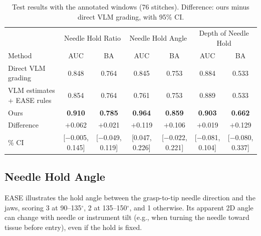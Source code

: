 \begin{table}[htb]
\centering
\small
\setlength{\tabcolsep}{4pt}
\caption{Test results with the annotated windows (76 stitches). Difference:
ours minus direct VLM grading, with 95\% CI.}
\label{tab:main}
\begin{tabular}{@{}lcccccc@{}}
\hline
& \multicolumn{2}{c}{Needle Hold Ratio} & \multicolumn{2}{c}{Needle Hold Angle}
& \multicolumn{2}{c}{Depth of Needle Hold} \\
Method & AUC & BA & AUC & BA & AUC & BA \\
\hline
Direct VLM grading & 0.848 & 0.764 & 0.845 & 0.753 & 0.884 & 0.533 \\
VLM estimates + EASE rules & 0.854 & 0.764 & 0.761 & 0.753 & 0.889 & 0.533 \\
Ours & \textbf{0.910} & \textbf{0.785} & \textbf{0.964} & \textbf{0.859}
& \textbf{0.903} & \textbf{0.662} \\
\hline
Difference & $+$0.062 & $+$0.021 & $+$0.119 & $+$0.106 & $+$0.019 & $+$0.129 \\
\quad 95\% CI & [$-$0.005, 0.145] & [$-$0.049, 0.119] & [0.047, 0.226]
& [$-$0.022, 0.221] & [$-$0.081, 0.104] & [$-$0.080, 0.337] \\
\hline
\end{tabular}
\end{table}

\subsection{Needle Hold Angle}
\label{ssec:angle}

EASE illustrates the hold angle between the grasp-to-tip needle direction
and the jaws, scoring 3 at 90--135$^\circ$, 2 at 135--150$^\circ$, and 1
otherwise. Its apparent 2D angle can change with needle or instrument tilt
(e.g., when turning the needle toward tissue before entry), even if the hold
is fixed.


